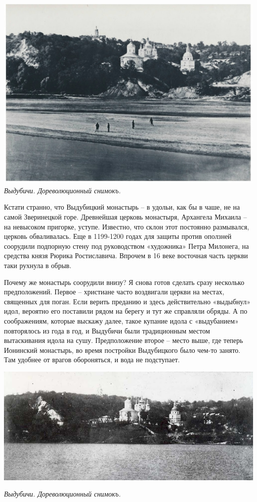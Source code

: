 \begin{center}
\includegraphics[width=\linewidth]{chast-vosp/zver/vydub.jpg}
\textit{Выдубичи. Дореволюционный снимокъ.}
\end{center}

Кстати странно, что Выдубицкий монастырь – в удольи, как бы в чаше, не на самой Зверинецкой горе. Древнейшая церковь монастыря, Архангела Михаила – на невысоком пригорке, уступе. Известно, что склон этот постоянно размывался, церковь обваливалась. Еще в 1199-1200 годах для защиты против оползней соорудили подпорную стену под руководством «художника» Петра Милонега, на средства князя Рюрика Ростиславича. Впрочем в 16 веке восточная часть церкви таки рухнула в обрыв.

Почему же монастырь соорудили внизу? Я снова готов сделать сразу несколько предположений. Первое – христиане часто воздвигали церкви на местах, священных для поган. Если верить преданию и здесь действительно «выдыбнул» идол, вероятно его поставили рядом на берегу и тут же справляли обряды. А по соображениям, которые выскажу далее, такое купание идола с «выдубанием» повторялось из года в год, и Выдубичи были традиционным местом вытаскивания идола на сушу. Предположение второе – место выше, где теперь Ионинский монастырь, во время постройки Выдубицкого было чем-то занято. Там удобнее от врагов обороняться, и вода не подступает.

\begin{center}
\includegraphics[width=\linewidth]{chast-vosp/zver/vydub-daleko.jpg}

\textit{Выдубичи. Дореволюционный снимокъ.}
\end{center}

